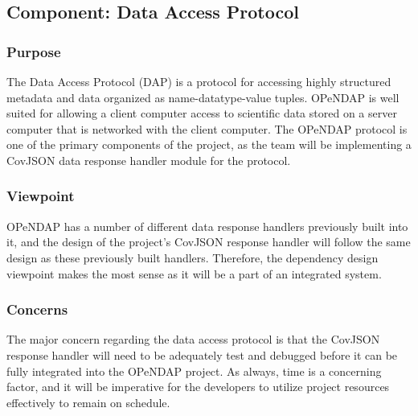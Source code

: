 \documentclass[onecolumn, draftclsnofoot,10pt, compsoc]{IEEEtran}
\begin{document}
\subsection{Component: Data Access Protocol}
\subsubsection{Purpose}
The Data Access Protocol (DAP) is a protocol for accessing highly structured metadata and data organized as name-datatype-value tuples. OPeNDAP is well suited for allowing a client computer access to scientific data stored on a server computer that is networked with the client computer. The OPeNDAP protocol is one of the primary components of the project, as the team will be implementing a CovJSON data response handler module for the protocol. 
\subsubsection{Viewpoint}
OPeNDAP has a number of different data response handlers previously built into it, and the design of the project's CovJSON response handler will follow the same design as these previously built handlers. Therefore, the dependency design viewpoint makes the most sense as it will be a part of an integrated system. \cite{IEEE}
\subsubsection{Concerns}
The major concern regarding the data access protocol is that the CovJSON response handler will need to be adequately test and debugged before it can be fully integrated into the OPeNDAP project. As always, time is a concerning factor, and it will be imperative for the developers to utilize project resources effectively to remain on schedule.
\end{document}
